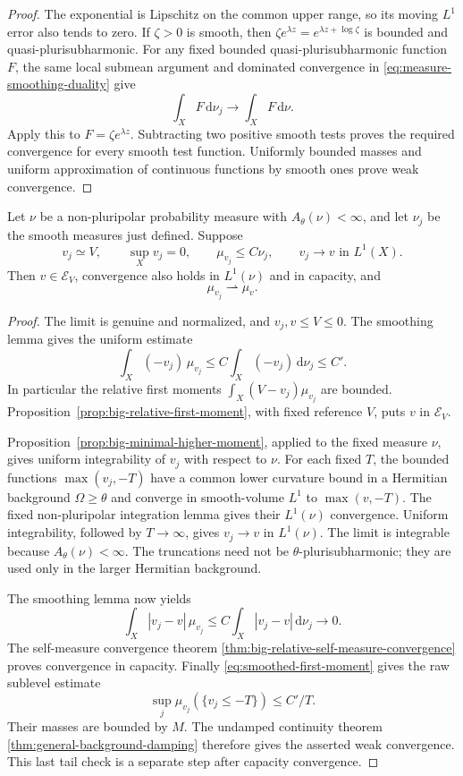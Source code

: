 \begin{proof}
The exponential is Lipschitz on the common upper range, so its moving $L^1$ error also tends to zero. If $\zeta>0$ is smooth, then $\zeta e^{\lambda z}=e^{\lambda z+\log\zeta}$ is bounded and quasi-plurisubharmonic. For any fixed bounded quasi-plurisubharmonic function $F$, the same local submean argument and dominated convergence in \eqref{eq:measure-smoothing-duality} give
\[
 \int_XF\,\mathrm{d}\nu_j\longrightarrow\int_XF\,\mathrm{d}\nu.
\]
Apply this to $F=\zeta e^{\lambda z}$. Subtracting two positive smooth tests proves the required convergence for every smooth test function. Uniformly bounded masses and uniform approximation of continuous functions by smooth ones prove weak convergence.
\end{proof}

\begin{proposition}\label{prop:big-smoothed-measure-continuity}
Let $\nu$ be a non-pluripolar probability measure with $A_\theta(\nu)<\infty$, and let $\nu_j$ be the smooth measures just defined. Suppose
\[
 v_j\simeq V,\qquad \sup_Xv_j=0,\qquad
 \mu_{v_j}\leq C\nu_j,
 \qquad v_j\longrightarrow v\text{ in }L^1(X).
\]
Then $v\in\mathcal E_V$, convergence also holds in $L^1(\nu)$ and in capacity, and
\[
 \mu_{v_j}\rightharpoonup\mu_v.
\]
\end{proposition}
\begin{proof}
The limit is genuine and normalized, and $v_j,v\leq V\leq0$. The smoothing lemma gives the uniform estimate
\begin{equation}\label{eq:smoothed-first-moment}
 \int_X(-v_j)\,\mu_{v_j}
 \leq C\int_X(-v_j)\,\mathrm{d}\nu_j\leq C'.
\end{equation}
In particular the relative first moments $\int_X(V-v_j)\mu_{v_j}$ are bounded. Proposition~\ref{prop:big-relative-first-moment}, with fixed reference $V$, puts $v$ in $\mathcal E_V$.

Proposition~\ref{prop:big-minimal-higher-moment}, applied to the fixed measure $\nu$, gives uniform integrability of $v_j$ with respect to $\nu$. For each fixed $T$, the bounded functions $\max(v_j,-T)$ have a common lower curvature bound in a Hermitian background $\Omega\geq\theta$ and converge in smooth-volume $L^1$ to $\max(v,-T)$. The fixed non-pluripolar integration lemma gives their $L^1(\nu)$ convergence. Uniform integrability, followed by $T\to\infty$, gives $v_j\to v$ in $L^1(\nu)$. The limit is integrable because $A_\theta(\nu)<\infty$. The truncations need not be $\theta$-plurisubharmonic; they are used only in the larger Hermitian background.

The smoothing lemma now yields
\[
 \int_X|v_j-v|\,\mu_{v_j}
 \leq C\int_X|v_j-v|\,\mathrm{d}\nu_j\longrightarrow0.
\]
The self-measure convergence theorem \cref{thm:big-relative-self-measure-convergence} proves convergence in capacity. Finally \eqref{eq:smoothed-first-moment} gives the raw sublevel estimate
\[
 \sup_j\mu_{v_j}(\{v_j\leq-T\})\leq C'/T.
\]
Their masses are bounded by $M$. The undamped continuity theorem \cref{thm:general-background-damping} therefore gives the asserted weak convergence. This last tail check is a separate step after capacity convergence.
\end{proof}

